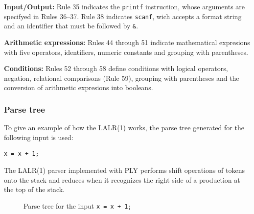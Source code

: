 \documentclass[letterpaper,12pt,oneside]{article}
\begin{document}
\textbf{Input/Output:} Rule 35 indicates the \texttt{printf} instruction, whose arguments are specifyed in Rules 36--37. Rule 38 indicates \texttt{scanf}, wich accepts a format string and an identifier that must be followed by \texttt{\&}. 

\textbf{Arithmetic expressions:} Rules 44 through 51 indicate mathematical expresions with five operators, identifiers, numeric constants and grouping with parentheses. 

\textbf{Conditions:} Rules 52 through 58 define conditions with logical operators, negation, relational comparisons (Rule 59), grouping with parentheses and the conversion of arithmetic expresions into booleans.

\newpage
\subsubsection{Parse tree}

To give an example of how the LALR(1) works, the parse tree generated for the following input is used:

\begin{lstlisting}
x = x + 1;
\end{lstlisting}

The LALR(1) parser implemented with PLY performs shift operations of tokens onto the stack and reduces when it recognizes the right side of a production at the top of the stack.

\begin{figure}[H]
\centering
{}
\caption{Parse tree for the input \texttt{x = x + 1;}}
\label{fig:parse_tree}
\end{figure}
\end{document}
